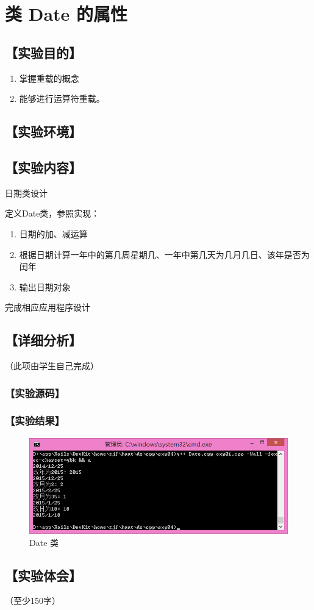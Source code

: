 \section{类 Date 的属性}
\hfill{}
\subsection*{【实验目的】}
\begin{enumerate}[topsep=0pt,partopsep=0pt,itemsep=0pt,parsep=0pt,label={\arabic*、}]
\item 掌握重载的概念
\item 能够进行运算符重载。
\end{enumerate}
\subsection*{【实验环境】}
\MyEnvironment
\subsection*{【实验内容】}
日期类设计

定义Date类，参照实现：
\begin{enumerate}[topsep=0pt,partopsep=0pt,itemsep=0pt,parsep=0pt,label={(\arabic*)}]
\item 日期的加、减运算
\item 根据日期计算一年中的第几周星期几、一年中第几天为几月几日、该年是否为闰年
\item 输出日期对象
\end{enumerate}

完成相应应用程序设计
\subsection*{【详细分析】}
（此项由学生自己完成）
\subsubsection*{【实验源码】}
{\linespread{1}}
{\linespread{1}}
{\linespread{1}}
\subsubsection*{【实验结果】}
\begin{figure}[htp]
\centering
\includegraphics[width=\textwidth]{exp05/exp01.png}
\caption{\label{out05_01}Date 类}
\end{figure}
\subsection*{【实验体会】}
（至少150字）
